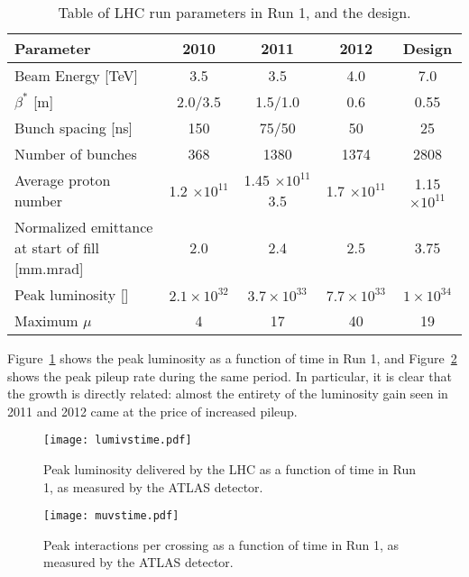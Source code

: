 
\begin{table}
	\caption{Table of LHC run parameters in Run 1, and the design.}
	\label{tab:lhc:parameters}
	\begin{center}
		\begin{tabular}{l|cccc}
		\hline

		\hline
		\textbf{Parameter} & \textbf{2010} & \textbf{2011} & \textbf{2012} & \textbf{Design} \\
		\hline
			 Beam Energy [TeV] & 3.5 &        3.5    &       4.0 &            7.0\\
			 $\beta^*$ [m]      & 2.0/3.5 &     1.5/1.0   &       0.6 &            0.55\\
			 Bunch spacing [ns] & 150 &         75/50   &       50 &             25\\
			 Number of bunches  & 368 &         1380    &       1374 &           2808\\
			 Average proton number  & 1.2 $\times 10^{11}$ &    1.45 $\times 10^{11}$     3.5    &   1.7 $\times 10^{11}$ &     1.15 $\times 10^{11}$\\
			 Normalized emittance at start of fill [mm.mrad]  & 2.0 &    2.4 &      2.5    &   3.75\\
			 Peak luminosity [\lumirate] & $2.1\times 10^{32}$   &  $3.7 \times 10^{33}$   & $7.7 \times 10^{33}$ & $1 \times 10^{34}$ \\
			 Maximum $\mu$ &  4  &  17   &  40 & 19 \\
		\hline

		\hline
		\end{tabular}
	\end{center}
\end{table}

Figure~\ref{fig:lhc:lumivstime} shows the peak luminosity as a function of time in Run 1, and Figure~\ref{fig:lhc:muvstime} shows the peak pileup rate during the same period. In particular, it is clear that the growth is directly related: almost the entirety of the luminosity gain seen in 2011 and 2012 came at the price of increased pileup.


\begin{figure}
\centering
\texttt{[image: lumivstime.pdf]}
\label{fig:lhc:lumivstime}
\caption{Peak luminosity delivered by the LHC as a function of time in Run 1, as measured by the ATLAS detector.}
\end{figure}




\begin{figure}
\centering
\texttt{[image: muvstime.pdf]}
\label{fig:lhc:muvstime}
\caption{Peak interactions per crossing as a function of time in Run 1, as measured by the ATLAS detector.}
\end{figure}



